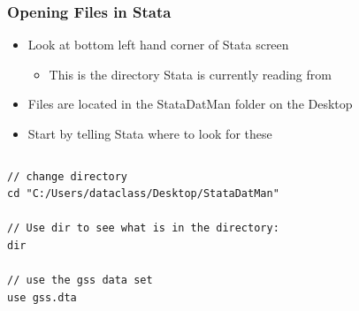\documentclass[table]{beamer}
\begin{document}
\begin{frame}[fragile]
\frametitle{Opening Files in Stata}
\label{sec-1-5}

\begin{itemize}
\item Look at bottom left hand corner of Stata screen
\begin{itemize}
\item This is the directory Stata is currently reading from
\end{itemize}
\item Files are located in the StataDatMan folder on the Desktop
\item Start by telling Stata where to look for these
\end{itemize}
\vspace{-.5em} \begin{columns}  \begin{block}{}

\begin{verbatim}
// change directory
cd "C:/Users/dataclass/Desktop/StataDatMan"

// Use dir to see what is in the directory:
dir

// use the gss data set
use gss.dta
\end{verbatim}
\end{block} \end{columns}
\end{frame}
\end{document}
